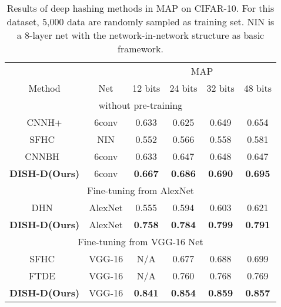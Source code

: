 \documentclass[conference]{IEEEtran}
\begin{document}
\begin{table}[t]
    \centering
    \footnotesize
    \begin{tabular}{c|c|cccc}
        \hline
         & & \multicolumn{4}{c}{MAP} \\
        Method & Net & 12 bits & 24 bits & 32 bits & 48 bits \\
        \hline
        \multicolumn{6}{c}{without pre-training} \\
        \hline
        CNNH+ & 6conv & 0.633 & 0.625 & 0.649 & 0.654 \\
        SFHC~\cite{lai2015simultaneous} & NIN & 0.552 & 0.566 & 0.558 & 0.581 \\
        CNNBH~\cite{guo2016hash} & 6conv & 0.633 & 0.647 & 0.648 & 0.647 \\
        \textbf{DISH-D(Ours)} & 6conv & \textbf{0.667} & \textbf{0.686} & \textbf{0.690} & \textbf{0.695} \\
        \hline
        \multicolumn{6}{c}{Fine-tuning from AlexNet} \\
        \hline
        DHN~\cite{zhu2016deep} & AlexNet & 0.555 & 0.594 & 0.603 & 0.621 \\
        \textbf{DISH-D(Ours)} & AlexNet & \textbf{0.758} & \textbf{0.784} & \textbf{0.799} & \textbf{0.791} \\
        \hline
        \multicolumn{6}{c}{Fine-tuning from VGG-16 Net} \\
        \hline
        SFHC~\cite{zhuang2016fast} & VGG-16 & N/A & 0.677 & 0.688 & 0.699 \\
        FTDE~\cite{zhuang2016fast} & VGG-16 & N/A & 0.760 & 0.768 & 0.769 \\
        \textbf{DISH-D(Ours)} & VGG-16 & \textbf{0.841} & \textbf{0.854} & \textbf{0.859} & \textbf{0.857} \\
        \hline
    \end{tabular}
    \caption{Results of deep hashing methods in MAP on CIFAR-10. For this dataset, 5,000 data are randomly sampled as training set. NIN is a 8-layer net with the network-in-network structure as basic framework.}
    \label{tab:cifar10_deep}
\end{table}
\end{document}
